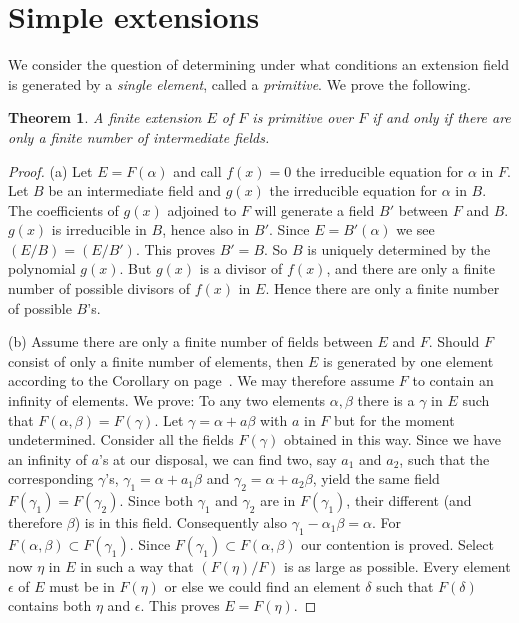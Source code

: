 \documentclass[10pt,leqno,a5paper]{book}
\newtheorem{theo}{Theorem}
\theoremstyle{definition}
\let\htw\section
\begin{document}
\htw{Simple extensions}

We consider the question of determining under what conditions an extension field is generated by a \emph{single element}, called a \emph{primitive}.
We prove the following.


\begin{theo}
\label{theo:26}
A finite extension $E$ of $F$ is primitive over $F$ if and only if there are only a finite number of intermediate fields.
\end{theo}


\begin{proof}
(a)\quad
Let $E = F(\alpha)$ and call $f(x) = 0$ the irreducible equation for $\alpha$ in $F$.
Let $B$ be an intermediate field and $g(x)$ the irreducible equation for $\alpha$ in $B$.
The coefficients of $g(x)$ adjoined to $F$ will generate a field $B'$ between $F$ and $B$.
$g(x)$ is irreducible in $B$, hence also in $B'$.
Since $E = B'(\alpha)$ we see $(E/B) = (E/B')$.
This proves $B' = B$.
So $B$ is uniquely determined by the polynomial $g(x)$.
But $g(x)$ is a divisor of $f(x)$, and there are only a finite number of possible divisors of $f(x)$ in $E$.
Hence there are only a finite number of possible $B$'s.

(b)\quad
Assume there are only a finite number of fields between $E$ and $F$.
Should $F$ consist of only a finite number of elements, then $E$ is generated by one element according to the Corollary on page~\pageref{coro:p53}.
We may therefore assume $F$ to contain an infinity of elements.
We prove:
To any two elements $\alpha,\beta$ there is a $\gamma$ in $E$ such that $F(\alpha,\beta) = F(\gamma)$.
Let $\gamma = \alpha + a \beta$ with $a$ in $F$ but for the moment undetermined.
Consider all the fields $F(\gamma)$ obtained in this way.
Since we have an infinity of $a$'s at our disposal, we can find two, say $a_1$ and $a_2$, such that the corresponding $\gamma$'s, $\gamma_1 = \alpha + a_1 \beta$ and $\gamma_2 = \alpha + a_2 \beta$, yield the same field $F(\gamma_1) = F(\gamma_2)$.
Since both $\gamma_1$ and $\gamma_2$ are in $F(\gamma_1)$, their different (and therefore $\beta$) is in this field.
Consequently also $\gamma_1 - \alpha_1 \beta = \alpha$.
For $F(\alpha,\beta) \subset F(\gamma_1)$.
Since $F(\gamma_1) \subset F(\alpha,\beta)$ our contention is proved.
Select now $\eta$ in $E$ in such a way that $(F(\eta) / F)$ is as large as possible.
Every element $\epsilon$ of $E$ must be in $F(\eta)$ or else we could find an element $\delta$ such that $F(\delta)$ contains both $\eta$ and $\epsilon$.
This proves $E = F(\eta)$.
\end{proof}
\end{document}
